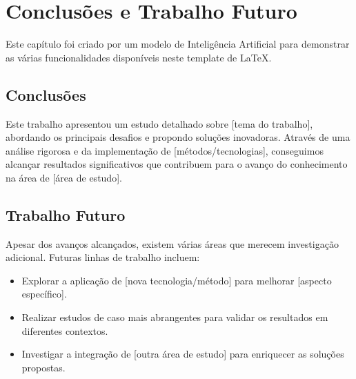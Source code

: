 \chapter{Conclusões e Trabalho Futuro}
\label{chap:conclusions}

\begin{introduction}
Este capítulo foi criado por um modelo de Inteligência Artificial para demonstrar as várias funcionalidades disponíveis neste template de \LaTeX{}.
\end{introduction}


\section{Conclusões}
Este trabalho apresentou um estudo detalhado sobre [tema do trabalho], abordando os principais desafios e propondo soluções inovadoras. Através de uma análise rigorosa e da implementação de [métodos/tecnologias], conseguimos alcançar resultados significativos que contribuem para o avanço do conhecimento na área de [área de estudo].

\section{Trabalho Futuro}
Apesar dos avanços alcançados, existem várias áreas que merecem investigação adicional. Futuras linhas de trabalho incluem:
\begin{itemize}
    \item Explorar a aplicação de [nova tecnologia/método] para melhorar [aspecto específico].
    \item Realizar estudos de caso mais abrangentes para validar os resultados em diferentes contextos.
    \item Investigar a integração de [outra área de estudo] para enriquecer as soluções propostas.
\end{itemize}   

